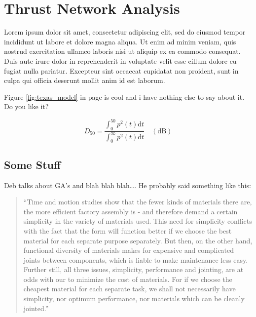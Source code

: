 \chapter{Thrust Network Analysis}
\label{chap:tna}

Lorem ipsum dolor sit amet, consectetur adipiscing elit, sed do eiusmod tempor
incididunt ut labore et dolore magna aliqua. Ut enim ad minim veniam, quis nostrud exercitation ullamco laboris nisi ut aliquip ex ea commodo consequat. Duis aute irure dolor in reprehenderit in voluptate velit esse cillum dolore eu fugiat nulla pariatur. Excepteur sint occaecat cupidatat non proident, sunt in culpa qui officia deserunt mollit anim id est laborum.

Figure \ref{fig:texas_model} in page \pageref{fig:texas_model} is cool and i
have nothing else to say about it. Do you like it?


\begin{equation}
D_{50} =   \frac{\displaystyle{\int^{50}_{0}p^{2}(t)
\mathrm{d}t}}{\displaystyle{\int^{\infty}_{0}p^{2}(t) \mathrm{d}t}}   \quad \mathrm{(dB)}
\end{equation}



\section{Some Stuff}
\label{sec:some_stuff}

Deb \cite{Deb2001} talks about GA's and blah blah blah\ldots. He probably said
something like this:

\begin{quotation}
``Time and motion studies show that the fewer kinds of materials there are, the more efficient factory assembly is - and therefore demand a certain simplicity in the variety of materials used. This need for simplicity conflicts with the fact that the form will function better if we choose the best material for each separate purpose separately. But then, on the other hand, functional diversity of materials makes for expensive and complicated joints between components, which is liable to make maintenance less easy. Further still, all three issues, simplicity, performance and jointing, are at odds with our  to minimize the cost of materials\cite{tms2013c}. For if we choose the cheapest material for each separate task, we shall not necessarily have simplicity, nor optimum performance, nor materials which can be cleanly jointed.''
\end{quotation}


